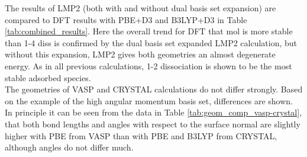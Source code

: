 \documentclass[11pt,DIV=13,BCOR=5mm,a4paper,headinclude]{scrbook}
\begin{document}
The results of LMP2 (both with and without dual basis set expansion) are compared to DFT results with PBE+D3 and B3LYP+D3 in Table \ref{tab:combined_results}.
Here the overall trend for DFT that mol is more stable than 1-4 diss is confirmed by the dual basis set expanded LMP2 calculation, but without this expansion, LMP2 gives both geometries an almost degenerate energy.
As in all previous calculations, 1-2 dissociation is shown to be the most stable  adsorbed species.
\\
 
The geometries of VASP and CRYSTAL calculations do not differ strongly.
Based on the example of the high angular momentum basis set, differences are shown.
In principle it can be seen from the data in Table \ref{tab:geom_comp_vasp-crystal}, that both bond lengths and angles with respect to the surface normal are slightly higher with PBE from VASP than with PBE and B3LYP from CRYSTAL, although angles do not differ much.
\end{document}
